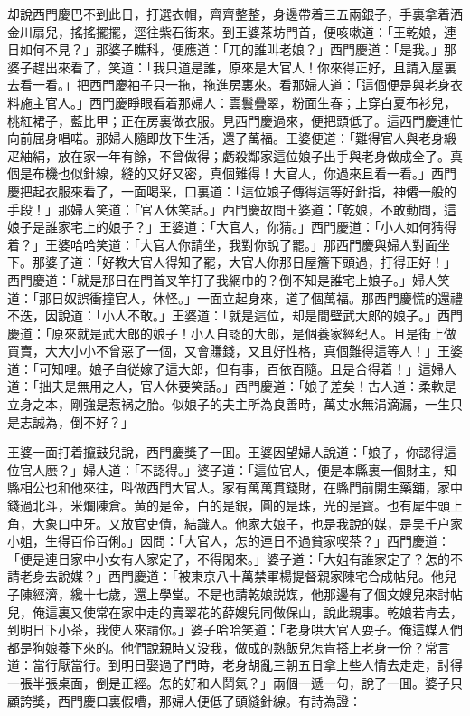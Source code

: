 却說西門慶巴不到此日，打選衣帽，齊齊整整，身邊帶着三五兩銀子，手裏拿着洒金川扇兒，搖搖擺擺，逕往紫石街來。到王婆茶坊門首，便咳嗽道：「王乾娘，連日如何不見？」那婆子瞧科，便應道：「兀的誰叫老娘？」西門慶道：「是我。」那婆子趕出來看了，笑道：「我只道是誰，原來是大官人！你來得正好，且請入屋裏去看一看。」把西門慶袖子只一拖，拖進房裏來。看那婦人道：「這個便是與老身衣料施主官人。」西門慶睜眼看着那婦人：雲鬟疊翠，粉面生春；上穿白夏布衫兒，桃紅裙子，藍比甲；正在房裏做衣服。見西門慶過來，便把頭低了。這西門慶連忙向前屈身唱喏。那婦人隨即放下生活，還了萬福。王婆便道：「難得官人與老身緞疋紬絹，放在家一年有餘，不曾做得；虧殺鄰家這位娘子出手與老身做成全了。真個是布機也似針線，縫的又好又密，真個難得！大官人，你過來且看一看。」西門慶把起衣服來看了，一面喝采，口裏道：「這位娘子傳得這等好針指，神僊一般的手段！」那婦人笑道：「官人休笑話。」西門慶故問王婆道：「乾娘，不敢動問，這娘子是誰家宅上的娘子？」王婆道：「大官人，你猜。」西門慶道：「小人如何猜得着？」王婆哈哈笑道：「大官人你請坐，我對你說了罷。」那西門慶與婦人對面坐下。那婆子道：「好教大官人得知了罷，大官人你那日屋簷下頭過，打得正好！」西門慶道：「就是那日在門首叉竿打了我網巾的？倒不知是誰宅上娘子。」婦人笑道：「那日奴誤衝撞官人，休怪。」一面立起身來，道了個萬福。那西門慶慌的還禮不迭，因說道：「小人不敢。」王婆道：「就是這位，却是間壁武大郎的娘子。」西門慶道：「原來就是武大郎的娘子！小人自認的大郎，是個養家經纪人。且是街上做買賣，大大小小不曾惡了一個，又會賺錢，又且好性格，真個難得這等人！」王婆道：「可知哩。娘子自従嫁了這大郎，但有事，百依百隨。且是合得着！」這婦人道：「拙夫是無用之人，官人休要笑話。」西門慶道：「娘子差矣！古人道：柔軟是立身之本，剛強是惹祸之胎。似娘子的夫主所為良善時，萬丈水無涓滴漏，一生只是志誠為，倒不好？」

王婆一面打着攛鼓兒說，西門慶獎了一囬。王婆因望婦人說道：「娘子，你認得這位官人麽？」婦人道：「不認得。」婆子道：「這位官人，便是本縣裏一個財主，知縣相公也和他來往，呌做西門大官人。家有萬萬貫錢財，在縣門前開生藥舖，家中錢過北斗，米爛陳倉。黄的是金，白的是銀，圓的是珠，光的是寳。也有犀牛頭上角，大象口中牙。又放官吏債，結識人。他家大娘子，也是我說的媒，是吴千户家小姐，生得百伶百俐。」因問：「大官人，怎的連日不過貧家喫茶？」西門慶道：「便是連日家中小女有人家定了，不得閑來。」婆子道：「大姐有誰家定了？怎的不請老身去說媒？」西門慶道：「被東京八十萬禁軍楊提督親家陳宅合成帖兒。他兒子陳經濟，纔十七歲，還上學堂。不是也請乾娘説媒，他那邊有了個文嫂兒來討帖兒，俺這裏又使常在家中走的賣翠花的薛嫂兒同做保山，說此親事。乾娘若肯去，到明日下小茶，我使人來請你。」婆子哈哈笑道：「老身哄大官人耍子。俺這媒人們都是狗娘養下來的。他們說親時又没我，做成的熟飯兒怎肯搭上老身一份？常言道：當行厭當行。到明日娶過了門時，老身胡亂三朝五日拿上些人情去走走，討得一張半張桌面，倒是正經。怎的好和人鬦氣？」兩個一遞一句，說了一囬。婆子只顧誇獎，西門慶口裏假嘈，那婦人便低了頭縫針線。有詩為證：

